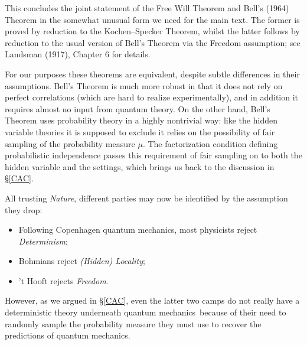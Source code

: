 \documentclass[11pt,a4paper]{article}
\numberwithin{equation}{section}
\newcommand{\qm}{quantum mechanics}
\begin{document}
This concludes the joint statement of the Free Will Theorem and Bell's (1964) Theorem in the somewhat unusual form we need for the main text. The former is proved by reduction to the Kochen--Specker Theorem, whilst the latter follows by reduction to the usual version of Bell's Theorem via the Freedom assumption; see Landsman (1917), Chapter 6 for details. 

For our purposes these theorems are equivalent, despite subtle differences in their assumptions. Bell's Theorem is much more robust in that it does not rely on perfect correlations (which are hard to realize experimentally), and in addition it requires almost no input from quantum theory.
On the other hand,  Bell's Theorem uses  probability theory in a highly nontrivial way: like the hidden variable theories it is supposed to exclude it relies on the possibility of fair sampling of the probability measure $\mu$. The 
  factorization condition defining probabilistic independence passes this requirement of fair sampling on to both the hidden variable and the settings, which brings us back to the discussion in \S\ref{CAC}. 
 \smallskip
 
 \noindent All trusting \emph{Nature},  different parties may now be identified by the assumption they drop:
 \begin{itemize}
\item Following Copenhagen \qm, most physicists reject \emph{Determinism};
\item Bohmians reject  \emph{(Hidden) Locality};
\item 't Hooft rejects  \emph{Freedom}. 
\end{itemize}
However, as we argued in \S\ref{CAC}, even the latter two camps do not really have a deterministic theory underneath \qm\ because of their need to randomly sample the probability measure they must use to recover the predictions of \qm. 
\end{document}
